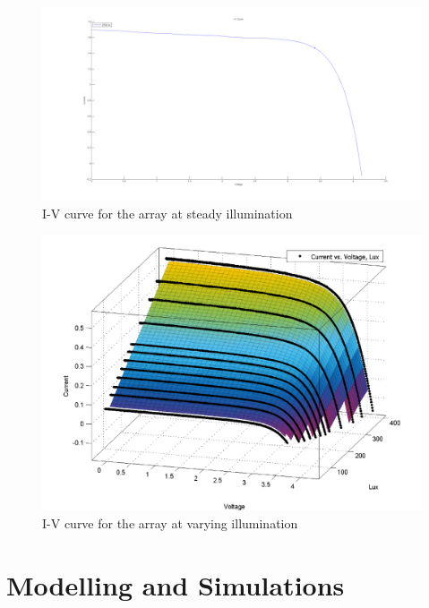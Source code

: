   \begin{figure}[H]
  \begin{center}
  \includegraphics[width=\textwidth]{images/single2500_IV}
  \caption{I-V curve for the array at steady illumination}
  \label{fig:2500luxIV}
  \end{center}
  \end{figure}
  
\begin{figure}[H]
  \begin{center}
  \includegraphics[width=\textwidth]{images/I-V-lux}
  \caption{I-V curve for the array at varying illumination}
  \label{fig:luxIV100_2500}
  \end{center}
  \end{figure}

\section{Modelling and Simulations} 

